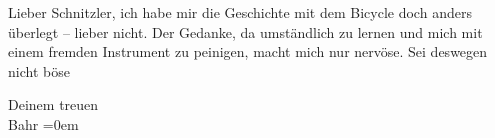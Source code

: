 \pstart{}Lieber Schnitzler,\pend\vspace{0.5em}
\pstart
           ich habe mir die Geschichte mit dem Bicycle doch anders überlegt – lieber nicht. Der
               Gedanke, da umständlich zu lernen und mich mit einem fremden Instrument zu peinigen,
               macht mich nur nervöse. Sei deswegen nicht böse\pend
           
\pstart
           Deinem treuen{\\[\baselineskip]}\spacefill\mbox{Bahr}\pend
           \leftskip=0em{}\endnumbering{}  \newcommand{\dateiname}{L00310}\newcommand{\titel}{Hermann Bahr an Arthur Schnitzler, 2. 4. 1894}\newcommand{\editorInnen}{Herausgegeben von Martin Anton Müller}
